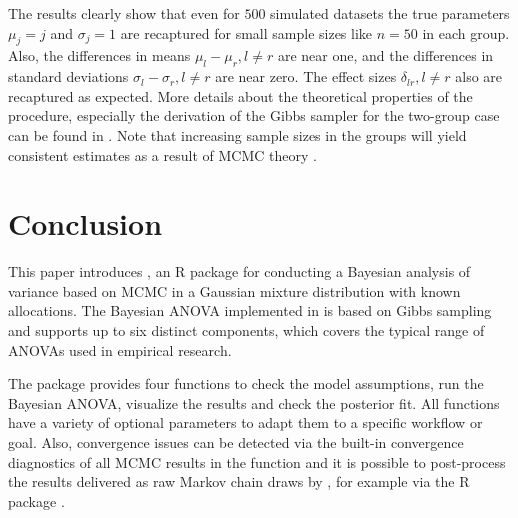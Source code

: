 The results clearly show that even for $500$ simulated datasets the true parameters $\mu_j=j$ and $\sigma_j=1$ are recaptured for small sample sizes like $n=50$ in each group. Also, the differences in means $\mu_l-\mu_r, l\neq r$ are near one, and the differences in standard deviations $\sigma_l-\sigma_r, l\neq r$ are near zero. The effect sizes $\delta_{lr}, l\neq r$ also are recaptured as expected. More details about the theoretical properties of the procedure, especially the derivation of the Gibbs sampler for the two-group case can be found in \cite{Kelter2020JORSBayest,Kelter2021StatisticsInBiosciences}. Note that increasing sample sizes in the groups will yield consistent estimates as a result of MCMC theory \cite{Robert2004}.



\section{Conclusion} \label{sec:summary}
This paper introduces , an R package for conducting a Bayesian analysis of variance based on MCMC in a Gaussian mixture distribution with known allocations. The Bayesian ANOVA implemented in  is based on Gibbs sampling and supports up to six distinct components, which covers the typical range of ANOVAs used in empirical research.

The package provides four functions to check the model assumptions, run the Bayesian ANOVA, visualize the results and check the posterior fit. All functions have a variety of optional parameters to adapt them to a specific workflow or goal. Also, convergence issues can be detected via the built-in convergence diagnostics of all MCMC results in the  function and it is possible to post-process the results delivered as raw Markov chain draws by , for example via the R package  \citep{Makowski2019a}.

